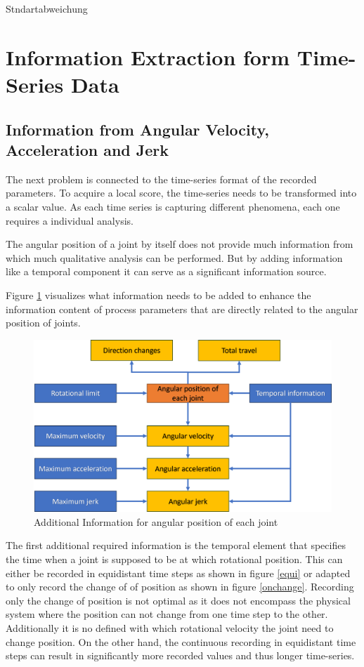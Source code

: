 Stndartabweichung 


\section{Information Extraction form Time-Series Data}\label{extraction}
\subsection{Information from Angular Velocity, Acceleration and Jerk}
The next problem is connected to the time-series format of the recorded parameters. To acquire a local score, the time-series needs to be transformed into a scalar value.
As each time series is capturing different phenomena, each one requires a individual analysis.


The angular position of a joint by itself does not provide much information from which much qualitative analysis can be performed. But by adding information like a temporal component it can serve as a significant information source. 

Figure \ref{agularstuff} visualizes what information needs to be added to enhance the information content of process parameters that are directly related to the angular position of joints.

\begin{figure}[H]
	\centerline{\includegraphics[scale=.55]{figures/angularstuff.png}}
	\caption{Additional Information for angular position of each joint}
	\label{agularstuff}
\end{figure}



The first additional required information is the temporal element that specifies the time when a joint is supposed to be at which rotational position. This can either be recorded in equidistant time steps as shown in figure \ref{equi} or adapted to only record the change of of position as shown in figure \ref{onchange}. Recording only the change of position is not optimal as it does not encompass the physical system where the position can not change from one time step to the other. Additionally it is no defined with which rotational velocity the joint need to change position. On the other hand, the continuous recording in equidistant time steps can result in significantly more recorded values and thus longer time-series.

